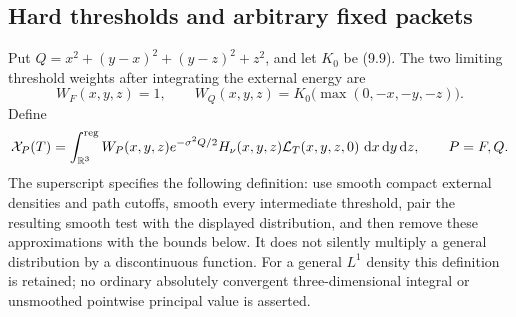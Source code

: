 \subsection{Hard thresholds and arbitrary fixed packets}
Put $Q=x^2+(y-x)^2+(y-z)^2+z^2$, and let $K_0$ be (9.9). The two
limiting threshold weights after integrating the external energy are
\begin{equation}
 W_F(x,y,z)=1,\qquad
 W_Q(x,y,z)=K_0\bigl(\max(0,-x,-y,-z)\bigr).
 \label{eq:logtime-threshold-weights}
\end{equation}
Define
\begin{equation}
 \mathcal X_P(T)=
 \int_{\mathbb R^3}^{\rm reg}
  W_P(x,y,z)e^{-\sigma^2 Q/2}H_\nu(x,y,z)
           \mathcal L_T(x,y,z,0)\,\mathop{}\!\mathrm d x\mathop{}\!\mathrm d y\mathop{}\!\mathrm d z,
 \qquad P=F,Q.
 \label{eq:logtime-packet}
\end{equation}
The superscript specifies the following definition: use smooth compact
external densities and path cutoffs, smooth every intermediate threshold,
pair the resulting smooth test with the displayed distribution, and then
remove these approximations with the bounds below. It does not silently
multiply a general distribution by a discontinuous function. For a general
$L^1$ density this definition is retained; no ordinary absolutely convergent
three-dimensional integral or unsmoothed pointwise principal value is asserted.


